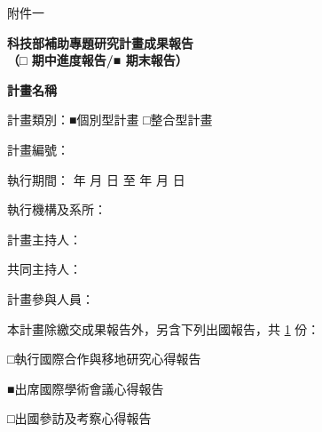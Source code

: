 \documentclass[12pt]{article}
\begin{document}
\vspace*{-1cm}
\noindent 附件一
\vspace*{1cm}

\begin{center}

{\bf \Large  科技部補助專題研究計畫成果報告 \\
（□ 期中進度報告/■ 期末報告）} 

\vspace{1.cm}
{\bf \Large  計畫名稱 }
\end{center}
\vspace{1.cm}

計畫類別：■個別型計畫   □整合型計畫 

計畫編號：  

執行期間：  年 月 日 至 年 月 日

\vspace{1cm}
執行機構及系所：

\vspace{1cm}
計畫主持人：

共同主持人：

計畫參與人員： 

\vspace{1.3cm}
本計畫除繳交成果報告外，另含下列出國報告，共 \underline{1} 份：

□執行國際合作與移地研究心得報告

■出席國際學術會議心得報告

□出國參訪及考察心得報告
\vspace{1.3cm}

%  
%  
%
%  

\vspace{\fill}
\begin{center}
\end{center}
\end{document}
